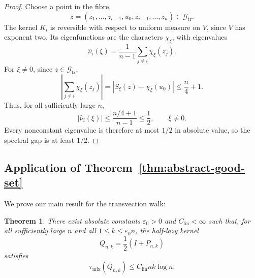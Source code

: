 \documentclass[11pt, reqno]{amsart}
\numberwithin{equation}{section}
\newtheorem{theorem}{Theorem}[section]
\newcommand{\Good}{\mathcal G}
\begin{document}
\begin{proof}
Choose a point in the fibre,
\[
    z=(z_1,\ldots,z_{i-1},u_0,z_{i+1},\ldots,z_n)\in\Good_{\mathrm{tr}}.
\]
The kernel \(K_i\) is reversible with respect to uniform measure on \(V\), since
\(V\) has exponent two.  Its eigenfunctions are the characters \(\chi_\xi\),
with eigenvalues
\[
    \widehat\nu_i(\xi)=\frac1{n-1}\sum_{j\ne i}\chi_\xi(z_j).
\]
For \(\xi\ne0\), since \(z\in\Good_{\mathrm{tr}}\),
\[
    \left|\sum_{j\ne i}\chi_\xi(z_j)\right|
    =|S_\xi(z)-\chi_\xi(u_0)|
    \le \frac n4+1.
\]
Thus, for all sufficiently large \(n\),
\[
    |\widehat\nu_i(\xi)|\le\frac{n/4+1}{n-1}\le\frac12,
    \qquad \xi\ne0.
\]
Every nonconstant eigenvalue is therefore at most \(1/2\) in absolute value,
so the spectral gap is at least \(1/2\).
\end{proof}

\subsection{Application of \texorpdfstring{Theorem~\ref*{thm:abstract-good-set}}{Theorem 2.7}}\label{subsec:transvection-apply}



We prove our main result for the transvection walk:

\begin{theorem}\label{thm:tr-linear-lazy}
There exist absolute constants \(\varepsilon_0>0\) and \(C_{\mathrm{lin}}<\infty\)
such that, for all sufficiently large \(n\) and all \(1\le k\le\varepsilon_0n\),
the half-lazy kernel
\[
    Q_{n,k}=\frac12(I+P_{n,k})
\]
satisfies
\[
    \tau_{\mathrm{mix}}(Q_{n,k})\le C_{\mathrm{lin}}nk\log n.
\]
\end{theorem}
\end{document}
